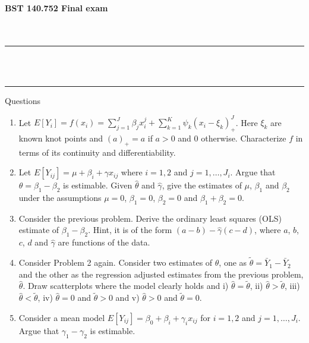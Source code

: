 \documentclass[12pt]{article}
\begin{document}
\noindent
{\bf BST 140.752 Final exam}  \\ \ \\ \ \\
\hrule
{}
\\ \ \\
\hrule

\noindent Questions 
\begin{enumerate}[1.]
\item Let $E[Y_{i}] = f(x_{i}) = \sum_{j=1}^J \beta_j x_{i}^j + \sum_{k=1}^K \psi_k (x_{i} - \xi_k)_+^J$. Here $\xi_k$ are known
knot points and $(a)_+ = a$ if $a > 0$ and $0$ otherwise. Characterize $f$ in terms of its continuity and differentiability. 
\item Let $E[Y_{ij}] = \mu + \beta_i + \gamma x_{ij}$ where $i = 1, 2$ and $j = 1,\ldots, J_i$. Argue
that $\theta = \beta_1 - \beta_2$ is estimable. Given $\hat \theta$ and $\hat \gamma$, give the estimates of $\mu$, $\beta_1$ and $\beta_2$ under
the assumptions $\mu=0$, $\beta_1 = 0$, $\beta_2 = 0$ and $\beta_1 + \beta_2 = 0$.
\item Consider the previous problem. Derive the ordinary least squares (OLS) estimate of 
$\beta_1 - \beta_2$. Hint, it is of the form $(a - b) - \hat \gamma(c - d)$, where $a$, $b$, $c$, $d$ and $\hat \gamma$ are functions of the data.
\item  Consider Problem 2 again. Consider two estimates of $\theta$, one as $\tilde \theta = \bar Y_1 - \bar Y_2$ and the other as the
regression adjusted estimates from the previous problem, $\hat \theta$. Draw scatterplots where the model clearly holds and 
i) $\hat \theta = \tilde \theta$, ii) $\hat \theta > \tilde \theta$, iii) $\hat \theta < \tilde \theta$, iv) $\hat \theta = 0$ and $\tilde \theta > 0$
and v) $\hat \theta > 0$ and $\tilde \theta = 0$.
\item Consider a mean model $E[Y_{ij}] = \beta_0 + \beta_i + \gamma_i x_{ij}$ for $i = 1, 2$ and $j = 1,\ldots, J_i$. Argue that
$\gamma_1 - \gamma_2$ is estimable.
\end{enumerate}
\end{document}
